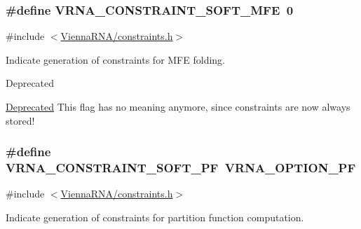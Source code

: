 \subsubsection[{V\+R\+N\+A\+\_\+\+C\+O\+N\+S\+T\+R\+A\+I\+N\+T\+\_\+\+S\+O\+F\+T\+\_\+\+M\+F\+E}]{\setlength{\rightskip}{0pt plus 5cm}\#define V\+R\+N\+A\+\_\+\+C\+O\+N\+S\+T\+R\+A\+I\+N\+T\+\_\+\+S\+O\+F\+T\+\_\+\+M\+F\+E~0}\label{group__constraints_ga62aa195893d02d1a79ca94952748df36}


{\ttfamily \#include $<$\hyperlink{constraints_8h}{Vienna\+R\+N\+A/constraints.\+h}$>$}



Indicate generation of constraints for M\+F\+E folding. 

\begin{DoxyRefDesc}{Deprecated}
\item[\hyperlink{deprecated__deprecated000040}{Deprecated}]This flag has no meaning anymore, since constraints are now always stored!\end{DoxyRefDesc}
\hypertarget{group__constraints_ga03fb5000c19b9a2082bf4ea30a543045}{}
\subsubsection[{V\+R\+N\+A\+\_\+\+C\+O\+N\+S\+T\+R\+A\+I\+N\+T\+\_\+\+S\+O\+F\+T\+\_\+\+P\+F}]{\setlength{\rightskip}{0pt plus 5cm}\#define V\+R\+N\+A\+\_\+\+C\+O\+N\+S\+T\+R\+A\+I\+N\+T\+\_\+\+S\+O\+F\+T\+\_\+\+P\+F~{\bf V\+R\+N\+A\+\_\+\+O\+P\+T\+I\+O\+N\+\_\+\+P\+F}}\label{group__constraints_ga03fb5000c19b9a2082bf4ea30a543045}


{\ttfamily \#include $<$\hyperlink{constraints_8h}{Vienna\+R\+N\+A/constraints.\+h}$>$}



Indicate generation of constraints for partition function computation. 

